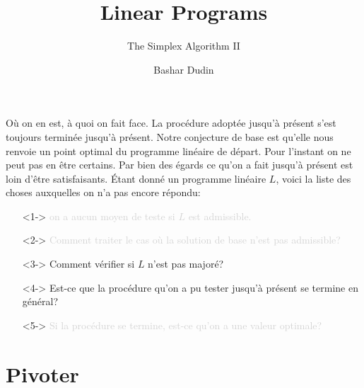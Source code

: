 \documentclass[aspectratio = 169]{beamer}
\author[BD]{Bashar Dudin}
\institute[]{EPITA}
\title{Linear Programs} %
\subtitle{The Simplex Algorithm II}
\begin{document}
\begin{frame}[plain]
\titlepage %
\end{frame}

\begin{frame}{Où on en est, à quoi on fait face.}
  La procédure adoptée jusqu'à présent s'est toujours terminée jusqu'à
  présent. Notre conjecture de base est qu'elle nous renvoie un point
  optimal du programme linéaire de départ. Pour l'instant on ne peut
  pas en être certains. Par bien des égards ce qu'on a fait jusqu'à
  présent est loin d'être satisfaisants. Étant donné un programme
  linéaire $L$, voici la liste des choses auxquelles on n'a pas encore
  répondu:
    \begin{itemize}
    \item[\textcolor<6>{lightgray}{\textbullet}]<1->
      \textcolor<6>{lightgray}{on a aucun moyen de teste si $L$ est
        admissible.}
    \item[\textcolor<6>{lightgray}{\textbullet}]<2->
      \textcolor<6>{lightgray}{Comment traiter le cas où la solution
        de base n'est pas admissible?}
        \item[\textbullet]<3->
          Comment vérifier si $L$ n'est pas majoré?
        \item[\textbullet]<4-> Est-ce que la procédure qu'on a pu
          tester jusqu'à présent se termine en général?
        \item[\textcolor<6>{lightgray}{\textbullet}]<5->
          \textcolor<6>{lightgray}{Si la procédure se termine, est-ce
            qu'on a une valeur optimale?}
    \end{itemize}
\end{frame}

\section{Pivoter}
\end{document}
